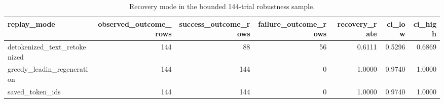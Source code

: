 \begin{table}
\caption{Recovery mode in the bounded 144-trial robustness sample.}
\label{tab:v3_recovery_modes}
\begin{tabular}{lrrrrrr}
\toprule
replay\_mode & observed\_outcome\_rows & success\_outcome\_rows & failure\_outcome\_rows & recovery\_rate & ci\_low & ci\_high \\
\midrule
detokenized\_text\_retokenized & 144 & 88 & 56 & 0.6111 & 0.5296 & 0.6869 \\
greedy\_leadin\_regeneration & 144 & 144 & 0 & 1.0000 & 0.9740 & 1.0000 \\
saved\_token\_ids & 144 & 144 & 0 & 1.0000 & 0.9740 & 1.0000 \\
\bottomrule
\end{tabular}
\end{table}
